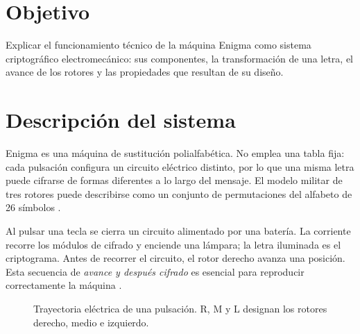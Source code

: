 \documentclass[letterpaper,12pt]{article}
\begin{document}

\newpage
\tableofcontents
\newpage

\section{Objetivo}
Explicar el funcionamiento técnico de la máquina Enigma como sistema criptográfico electromecánico: sus componentes, la transformación de una letra, el avance de los rotores y las propiedades que resultan de su diseño.

\section{Descripción del sistema}
Enigma es una máquina de sustitución polialfabética. No emplea una tabla fija: cada pulsación configura un circuito eléctrico distinto, por lo que una misma letra puede cifrarse de formas diferentes a lo largo del mensaje. El modelo militar de tres rotores puede describirse como un conjunto de permutaciones del alfabeto de 26 símbolos \cite{friedman-enigma,friedman-lectures}.

Al pulsar una tecla se cierra un circuito alimentado por una batería. La corriente recorre los módulos de cifrado y enciende una lámpara; la letra iluminada es el criptograma. Antes de recorrer el circuito, el rotor derecho avanza una posición. Esta secuencia de \emph{avance y después cifrado} es esencial para reproducir correctamente la máquina \cite{friedman-enigma}.

\begin{figure}[H]
\centering
{}
\caption{Trayectoria eléctrica de una pulsación. R, M y L designan los rotores derecho, medio e izquierdo.}
\label{fig:trayectoria}
\end{figure}
\end{document}
